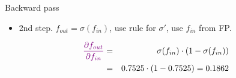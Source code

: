 \begin{vbframe}{Backward pass}
  \begin{itemize}
    \item 2nd step. $f_{out} = \sigma(f_{in})$, use rule for $\sigma'$, use ${f_{in}}$ from FP.
  \end{itemize}
    \begin{eqnarray*}
      \textcolor{violet}{\frac{\partial f_{out}}{\partial f_{in}}}  &=& \sigma({f_{in}})\cdot(1-\sigma({f_{in}})) \\
      &=& \num[round-mode=places,round-precision=4]{0.7525469} \cdot (1 - \num[round-mode=places,round-precision=4]{0.7525469}) = \num[round-mode=places,round-precision=4]{0.1862201}
    \end{eqnarray*}
      \vspace{-0.5cm}
    \begin{figure}
      \centering
    \end{figure}
\framebreak


\end{vbframe}
